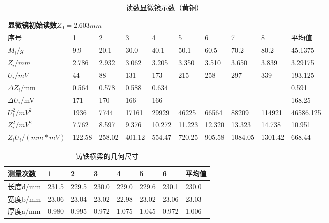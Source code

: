 \documentclass[UTF-8,twoside,cs4size]{ctexart}
\begin{document}
\begin{table}[!h]
    \centering
    \caption{读数显微镜示数（黄铜）}
    \begin{tabular}{|l|l|l|l|l|l|l|l|l|l|}
        \multicolumn{10}{l}{显微镜初始读数$Z_0=2.603 mm$} \\ \hline
        序号 & 1 & 2 & 3 & 4 & 5 & 6 & 7 & 8 & 平均值 \\ \hline
        $M_i/g$ & 9.9 & 20.1 & 30.0 & 40.1 & 50.1 & 60.5 & 70.2 & 80.2 & 45.1375 \\ \hline
        $Z_i/mm$ & 2.786 & 2.932 & 3.062 & 3.205 & 3.350& 3.510 & 3.650 & 3.839 & 3.29175 \\ \hline
        $U_i/mV$ & 44 & 88 & 131 & 173 & 215 & 258 & 297 & 339 &  193.125 \\ \hline
        $\Delta Z_i$/mm & 0.564 & 0.578 & 0.588 & 0.634 & \multicolumn{4}{c|}{} &0.591 \\ \cline{1-5}\cline{10-10}
        $\Delta U_i$/mV & 171 & 170 & 166 & 166 &\multicolumn{4}{c|}{} & 168.25 \\ \hline
        $U_i^2/mV^2$ & 1936 & 7744 & 17161 & 29929 & 46225 & 66564 & 88209 & 114921 & 46586.125 \\ \hline
        $Z_i^2/mV^2$ & 7.762 & 8.597 & 9.376 & 10.272 & 11.223 & 12.320 & 13.323 & 14.738 & 10.951 \\ \hline
        $Z_iU_i/(mm*mV)$ & 122.58 & 258.02 & 401.12 & 554.47 & 720.25 & 905.58 & 1084.05 & 1301.42 & 668.44 \\ \hline
    \end{tabular}
\end{table}
\begin{table}[!h]
    \centering
    \caption{铸铁横梁的几何尺寸}
    \begin{tabular}{|l|l|l|l|l|l|l|l|}
    \hline
        测量次数 & 1 & 2 & 3 & 4 & 5 & 6 & 平均值 \\ \hline
        长度d/mm & 231.5 & 229.5 & 230.0 & 229.0 & 229.6 & 230.1 &230.0 \\ \hline
        宽度b/mm & 23.06 & 23.04 & 23.02 & 22.98 & 23.02 & 23.06 &23.03  \\ \hline
        厚度a/mm & 0.980 & 0.995 & 0.972 & 1.075 & 1.045 & 0.972 & 1.006 \\ \hline
    \end{tabular}
\end{table}
\end{document}
